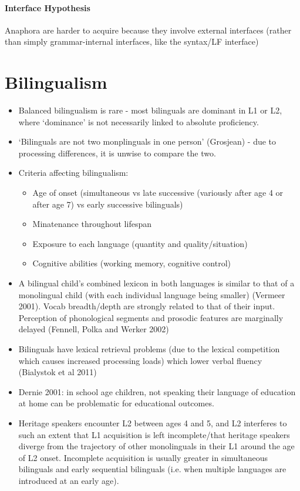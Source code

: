 \documentclass{article}
\begin{document}
\begin{itemize}
    \paragraph{Interface Hypothesis} Anaphora are harder to acquire because they involve external interfaces (rather than simply grammar-internal interfaces, like the syntax/LF interface)
\end{itemize}
\section{Bilingualism}
\begin{itemize}
    \item Balanced bilingualism is rare - most bilinguals are dominant in L1 or L2, where `dominance' is not necessarily linked to absolute proficiency.
    \item `Bilinguals are not two monplinguals in one person' (Grosjean) - due to processing differences, it is unwise to compare the two.
    \item Criteria affecting bilingualism:
    \begin{itemize}
        \item Age of onset (simultaneous vs late successive (variously after age 4 or after age 7) vs early successive bilinguals)
        \item Minatenance throughout lifespan
        \item Exposure to each language (quantity and quality/situation)
        \item Cognitive abilities (working memory, cognitive control)
    \end{itemize}
    \item A bilingual child's combined lexicon in both languages is similar to that of a monolingual child (with each individual language being smaller) (Vermeer 2001). Vocab breadth/depth are strongly related to that of their input. Perception of phonological segments and prosodic features are marginally delayed (Fennell, Polka and Werker 2002)
    \item Bilinguals have lexical retrieval problems (due to the lexical competition which causes increased processing loads) which lower verbal fluency (Bialystok et al 2011)
    \item Dernie 2001: in school age children, not speaking their language of education at home can be problematic for educational outcomes.
    \item Heritage speakers encounter L2 between ages 4 and 5, and L2 interferes to such an extent that L1 acquisition is left incomplete/that heritage speakers diverge from the trajectory of other monolinguals in their L1 around the age of L2 onset. Incomplete acquisition is usually greater in simultaneous bilinguals and early sequential bilinguals (i.e. when multiple languages are introduced at an early age).

\end{itemize}
\end{document}
